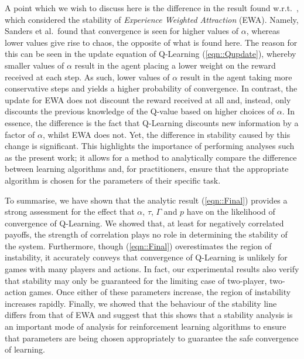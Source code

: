 \documentclass[sigconf,anonymous]{aamas}
\begin{document}
A point which we wish to discuss here is the difference in the result found w.r.t.~\cite{Sanders2018}, which considered the stability of \textit{Experience Weighted Attraction} (EWA). Namely, Sanders et al.~found that convergence is seen for higher values of $\alpha$, whereas lower values give rise to chaos, the opposite of what is found here. The reason for this can be seen in the update equation of Q-Learning (\ref{eqn::Qupdate}), whereby
smaller values of $\alpha$ result in the agent placing a lower weight on the reward received at each step. As such, lower values of $\alpha$ result in the agent taking more conservative steps and yields a higher probability of convergence. In contrast, the update for EWA does not discount the reward received at all and, instead, only discounts the previous knowledge of the Q-value based on higher choices of $\alpha$. In essence, the difference is the fact that Q-Learning discounts new information by a factor of $\alpha$, whilst EWA does not. Yet, the difference in stability caused by this change is significant. This highlights the importance of performing analyses such as the present work; it allows for a method to analytically compare the difference between learning algorithms and, for practitioners, ensure that the appropriate algorithm is chosen for the parameters of their specific task.


To summarise, we have shown that the analytic result
(\ref{eqn::Final}) provides a strong assessment for the effect that
$\alpha$, $\tau$, $\Gamma$ and $p$ have on the likelihood of
convergence of Q-Learning. We showed that, at least for negatively
correlated payoffs, the strength of correlation plays no role in
determining the stability of the system. Furthermore, though
(\ref{eqn::Final}) overestimates the region of instability, it
accurately conveys that convergence of Q-Learning is unlikely for
games with many players and actions. In fact, our experimental results
also verify that stability may only be guaranteed for the limiting
case of two-player, two-action games. Once either of these parameters increase, the region of instability increases rapidly.
%
Finally, we showed that the behaviour of the stability line differs
from that of EWA and suggest that this shows that a stability analysis
is an important mode of analysis for reinforcement learning algorithms
to ensure that parameters are being chosen appropriately to guarantee
the safe convergence of learning.


\end{document}
